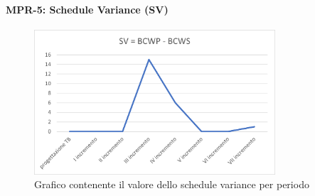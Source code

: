 \paragraph{MPR-5: Schedule Variance (SV)}\label{_SV}
\begin{figure}[!htb]
    \centering
    \includegraphics[width=0.8\textwidth]{res/images/metriche_costi/SV.png}
    \caption{Grafico contenente il valore dello schedule variance per periodo}
\end{figure} 

\newpage

